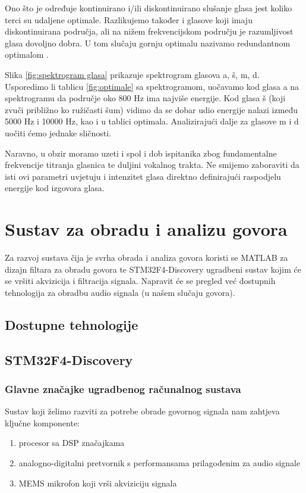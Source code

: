 \documentclass[times, utf8, diplomski]{fer}
\begin{document}
Ono što je određuje kontinuirano i/ili diskontinuirano slušanje glasa jest koliko terci su udaljene optimale. Razlikujemo također i glasove koji imaju diskontinuirana područja, ali na nižem frekvencijskom području je razumljivost glasa dovoljno dobra. U tom slučaju gornju optimalu nazivamo redundantnom optimalom \cite{slusanje}.


Slika \ref{fig:spektrogram glasa} prikazuje spektrogram glasova a, š, m, d. Usporedimo li tablicu \ref{fig:optimale} sa spektrogramom, uočavamo kod glasa a na spektrogramu da područje oko 800 Hz ima najviše energije. Kod glasa š (koji zvuči približno ko ružičasti šum) vidimo da se dobar udio energije nalazi između 5000 Hz i 10000 Hz, kao i u tablici optimala. Analizirajući dalje za glasove m i d uočiti ćemo jednake sličnosti.

Naravno, u obzir moramo uzeti i spol i dob ispitanika zbog fundamentalne frekvencije titranja glasnica te duljini vokalnog trakta. Ne smijemo zaboraviti da isti ovi parametri uvjetuju i intenzitet glasa direktno definirajući raspodjelu energije kod izgovora glasa.
\chapter{Sustav za obradu i analizu govora}
Za razvoj sustava čija je svrha obrada i analiza govora koristi se MATLAB za dizajn filtara za obradu govora te STM32F4-Discovery ugradbeni sustav kojim će se vršiti akvizicija i filtracija signala. Napravit će se pregled već dostupnih tehnologija za obradbu audio signala (u našem slučaju govora).

\section{Dostupne tehnologije}


\section{STM32F4-Discovery}

\subsection{Glavne značajke ugradbenog računalnog sustava}
Sustav koji želimo razviti za potrebe obrade govornog signala nam zahtjeva ključne komponente:

\begin{enumerate}
\item procesor sa DSP značajkama
\item analogno-digitalni pretvornik s performansama prilagođenim za audio signale
\item MEMS mikrofon koji vrši akviziciju signala
\end{enumerate}
\end{document}
